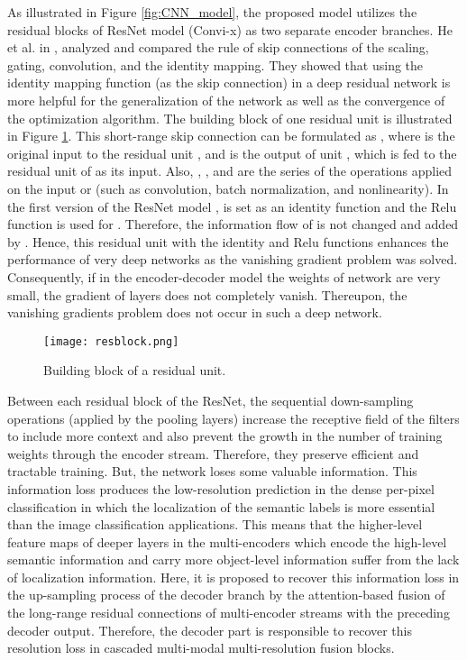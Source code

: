 \documentclass[journal,transmag]{IEEEtran}
\begin{document}
As illustrated in Figure \ref{fig:CNN_model}, the proposed model utilizes the residual blocks of ResNet model (Convi-x)  as two separate encoder branches. He et al. in \cite{he2016identity}, analyzed and compared the rule of skip connections of the scaling, gating,  convolution, and the identity mapping. They showed that using the identity mapping function (as the skip connection) in a deep residual network is more helpful for the generalization of the network as well as the convergence of the optimization algorithm. The building block of one residual unit is illustrated in Figure \ref{fig:resblock}. This short-range skip connection can be formulated as , where  is the original input to the residual unit  , and  is the output of unit , which is fed to the residual unit of  as its input. Also, , , and  are the series of the operations applied on the input  or  (such as convolution, batch normalization, and nonlinearity). In the first version of the ResNet model \cite{he2016deep},   is set as an identity function and the Relu function is used for . Therefore, the information flow of   is not changed and added by . Hence, this residual unit with the identity and Relu functions enhances the performance of very deep networks as the vanishing gradient problem was solved. Consequently, if in the encoder-decoder model the weights of network are very small, the gradient of layers does  not completely vanish. Thereupon, the vanishing gradients problem does not occur in such a deep network. 
\begin{figure}
	\begin{center}
		\texttt{[image: resblock.png]}
	\end{center}
	\caption{ Building block of a residual unit\cite{he2016deep}.}
	\label{fig:resblock}
\end{figure}

Between each residual block of the ResNet, the sequential down-sampling operations (applied by the pooling layers)  increase the receptive field of the filters to include more context and also prevent the growth in the number of training weights through the encoder stream. Therefore, they preserve efficient and tractable training. But, the network loses some valuable information. This information loss produces the low-resolution prediction in the dense per-pixel classification in which the localization of the semantic labels is more essential than the image classification applications. This means that the higher-level feature maps of deeper layers in the multi-encoders which encode the high-level semantic information and carry more object-level information suffer from the lack of localization information. Here, it is proposed to recover this information loss in the up-sampling process of the decoder branch by the attention-based fusion of the long-range residual connections of multi-encoder streams with the preceding decoder output.  Therefore, the decoder part is responsible to recover this resolution loss in cascaded multi-modal multi-resolution fusion blocks. 
\end{document}
